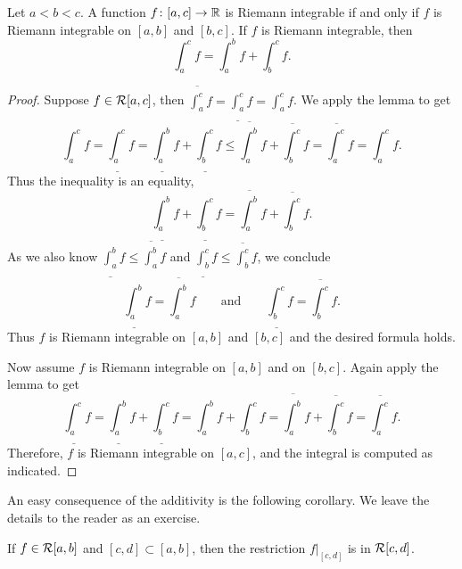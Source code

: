 \begin{prop}
Let $a < b < c$.  A function $f \colon [a,c] \to {\mathbb{R}}$ is Riemann integrable
if and only if $f$ is Riemann integrable on $[a,b]$ and $[b,c]$.  If
$f$ is Riemann integrable, then
\begin{equation*}
\int_a^c f
=
\int_a^b f
+
\int_b^c f .
\end{equation*}
\end{prop}

\begin{proof}
Suppose $f \in {\mathcal{R}}[a,c]$, then 
$\overline{\int_a^c} f = 
\underline{\int_a^c} f = 
\int_a^c f$.  We apply the lemma to get
\begin{equation*}
\int_a^c f
=
\underline{\int_a^c} f
 =
\underline{\int_a^b} f + \underline{\int_b^c} f
 \leq
\overline{\int_a^b} f + \overline{\int_b^c} f
 =
\overline{\int_a^c} f
 =
\int_a^c f .
\end{equation*}
Thus the inequality is an equality,
\begin{equation*}
\underline{\int_a^b} f + \underline{\int_b^c} f
=
\overline{\int_a^b} f + \overline{\int_b^c} f .
\end{equation*}
As we also know 
$\underline{\int_a^b} f \leq \overline{\int_a^b} f$
and
$\underline{\int_b^c} f \leq \overline{\int_b^c} f$, we 
conclude 
\begin{equation*}
\underline{\int_a^b} f
=
\overline{\int_a^b} f
\qquad \text{and} \qquad
\underline{\int_b^c} f
=
\overline{\int_b^c} f .
\end{equation*}
Thus $f$ is Riemann integrable on $[a,b]$ and $[b,c]$ and the desired formula
holds.

Now assume $f$ is Riemann integrable on $[a,b]$ and on $[b,c]$.
Again apply the lemma to get
\begin{equation*}
\underline{\int_a^c} f
=
\underline{\int_a^b} f + \underline{\int_b^c} f
=
\int_a^b f + \int_b^c f
=
\overline{\int_a^b} f + \overline{\int_b^c} f
=
\overline{\int_a^c} f .
\end{equation*}
Therefore, $f$ is Riemann integrable on $[a,c]$, and the integral is computed
as indicated.
\end{proof}

An easy consequence of the additivity is the following corollary.  We
leave the details to the reader as an exercise.

\begin{cor} \label{intsubcor}
If $f \in {\mathcal{R}}[a,b]$ and
$[c,d] \subset [a,b]$, then
the restriction $f|_{[c,d]}$ is in ${\mathcal{R}}[c,d]$.
\end{cor}

